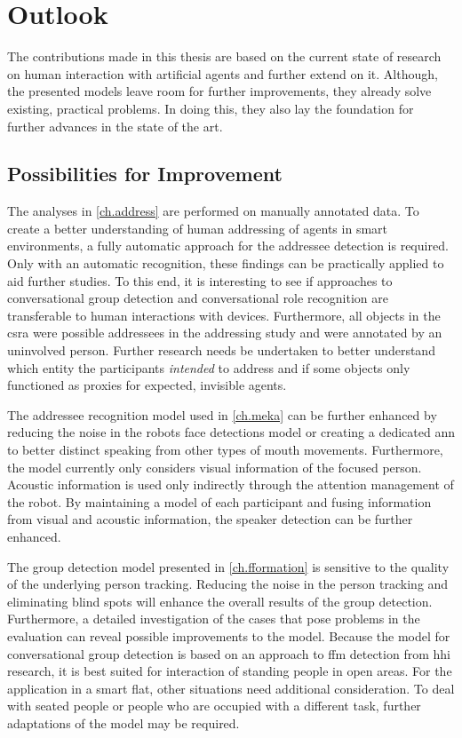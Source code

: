 \chapter{Outlook}

The contributions made in this thesis are based on the current state of research on human interaction with \glspl{artificial agent} and further extend on it.
Although, the presented models leave room for further improvements, they already solve existing, practical problems.
In doing this, they also lay the foundation for further advances in the state of the art.

\section{Possibilities for Improvement}

The analyses in \cref{ch.address} are performed on manually annotated data.
To create a better understanding of human addressing of agents in \glspl{smart environment}, a fully automatic approach for the \gls{addressee} detection is required.
Only with an automatic recognition, these findings can be practically applied to aid further studies. 
To this end, it is interesting to see if approaches to \gls{conversational group} detection and \gls{conversational role} recognition are transferable to human interactions with \glspl{device}.
Furthermore, all objects in the \gls{csra} were possible \glspl{addressee} in the \gls{addressing study} and were annotated by an uninvolved person.
Further research needs be undertaken to better understand which entity the participants \emph{intended} to address and if some objects only functioned as proxies for expected, invisible agents.  

The \gls{addressee} recognition model used in \cref{ch.meka} can be further enhanced by reducing the noise in the \glspl{robot} face detections model or creating a dedicated \gls{ann} to better distinct speaking from other types of mouth movements.
Furthermore, the model currently only considers visual information of the focused person.
Acoustic information is used only indirectly through the attention management of the \gls{robot}.
By maintaining a model of each participant and fusing information from visual and acoustic information, the \gls{speaker} detection can be further enhanced.

The group detection model presented in \cref{ch.fformation} is sensitive to the quality of the underlying person tracking.
Reducing the noise in the person tracking and eliminating blind spots will enhance the overall results of the group detection.
Furthermore, a detailed investigation of the cases that pose problems in the evaluation can reveal possible improvements to the model.
Because the model for \gls{conversational group} detection is based on an approach to \gls{ffm} detection from \gls{hhi} research, it is best suited for interaction of standing people in open areas.
For the application in a smart flat, other situations need additional consideration.
To deal with seated people or people who are occupied with a different task, further adaptations of the model may be required.

